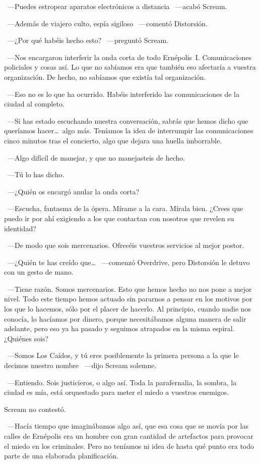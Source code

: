 ~---Puedes estropear aparatos electrónicos a distancia ~---acabó Scream.

~---Además de viajero culto, espía sigiloso ~---comentó Distorsión.

~---¿Por qué habéis hecho esto? ~---preguntó Scream.

~---Nos encargaron interferir la onda corta de todo Ernépolis~I. Comunicaciones policiales y cosas así. Lo que no sabíamos era que también eso afectaría a vuestra organización. De hecho, no sabíamos que existía tal organización.

~---Eso no es lo que ha ocurrido. Habéis interferido las comunicaciones de la ciudad al completo.

~---Si has estado escuchando nuestra conversación, sabrás que hemos dicho que queríamos hacer\dots\ algo más. Teníamos la idea de interrumpir las comunicaciones cinco minutos tras el concierto, algo que dejara una huella imborrable.

~---Algo difícil de manejar, y que no manejasteis de hecho.

~---Tú lo has dicho.

~---¿Quién os encargó anular la onda corta?

~---Escucha, fantasma de la ópera. Mírame a la cara. Mírala bien. ¿Crees que puedo ir por ahí exigiendo a los que contactan con nosotros que revelen su identidad?

~---De modo que sois mercenarios. Ofrecéis vuestros servicios al mejor postor.

~---¿Quién te has creído que\dots\? ~---comenzó Overdrive, pero Distorsión le detuvo con un gesto de mano.

~---Tiene razón. Somos mercenarios. Esto que hemos hecho no nos pone a mejor nivel. Todo este tiempo hemos actuado sin pararnos a pensar en los motivos por los que lo hacemos, sólo por el placer de hacerlo. Al principio, cuando nadie nos conocía, lo hacíamos por dinero, porque necesitábamos alguna manera de salir adelante, pero eso ya ha pasado y seguimos atrapados en la misma espiral. ¿Quiénes sois?

~---Somos Los Caídos, y tú eres posiblemente la primera persona a la que le decimos nuestro nombre ~---dijo Scream solemne.

~---Entiendo. Sois justicieros, o algo así. Toda la parafernalia, la sombra, la ciudad es mía, está orquestado para meter el miedo a vuestros enemigos.

Scream no contestó.

~---Hacía tiempo que imaginábamos algo así, que esa cosa que se movía por las calles de Ernépolis era un hombre con gran cantidad de artefactos para provocar el miedo en los criminales. Pero no teníamos ni idea de hasta qué punto era todo parte de una elaborada planificación.

